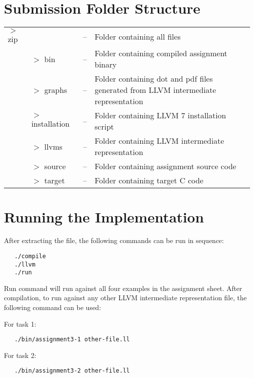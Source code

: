 \documentclass[11pt,a4paper,fleqn]{article}
\begin{document}
\section{Submission Folder Structure}

\begin{tabularx}{\linewidth}{l l l X}
   $>$ zip &                  & -- & Folder containing all files                                                         \\
           & $>$ bin          & -- & Folder containing compiled assignment binary                                        \\
           & $>$ graphs       & -- & Folder containing dot and pdf files generated from LLVM intermediate representation \\
           & $>$ installation & -- & Folder containing LLVM 7 installation script                                        \\
           & $>$ llvms        & -- & Folder containing LLVM intermediate representation                                  \\
           & $>$ source       & -- & Folder containing assignment source code                                            \\
           & $>$ target       & -- & Folder containing target C code                                                     \\
\end{tabularx}

\section {Running the Implementation}

After extracting the file, the following commands can be run in sequence:

\begin{verbatim}
   ./compile
   ./llvm
   ./run
\end{verbatim}

Run command will run against all four examples in the assignment sheet. After compilation, to run against any other LLVM intermediate representation file, the following command can be used:

For task 1:
\begin{verbatim}
   ./bin/assignment3-1 other-file.ll
\end{verbatim}

For task 2:
\begin{verbatim}
   ./bin/assignment3-2 other-file.ll
\end{verbatim}
\end{document}

